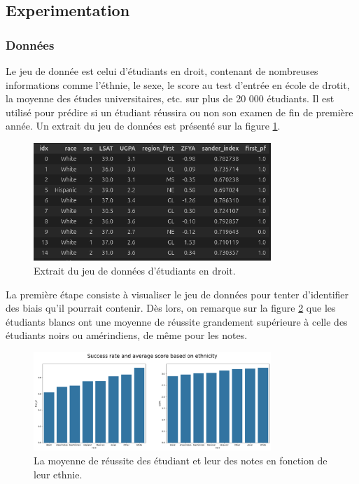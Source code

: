 \documentclass[12pt, letterpaper]{article}
\begin{document}
\subsection{Experimentation}

\subsubsection{Données}
Le jeu de donnée est celui d'étudiants en droit, contenant de nombreuses informations comme l'éthnie, le sexe, le score au test d'entrée en école de drotit, la moyenne des études universitaires, etc. sur plus de 20 000 étudiants.
Il est utilisé pour prédire si un étudiant réussira ou non son examen de fin de première année. Un extrait du jeu de données est présenté sur la figure \ref{fig:law_data}.

\begin{figure}[h!]
    \centering
    \includegraphics[width=0.8\textwidth]{law_data}
    \caption{Extrait du jeu de données d'étudiants en droit.}
    \label{fig:law_data}
\end{figure}

La première étape consiste à visualiser le jeu de données pour tenter d'identifier des biais qu'il pourrait contenir.
Dès lors, on remarque sur la figure \ref{fig:success_rate} que les étudiants blancs ont une moyenne de réussite grandement supérieure à celle des étudiants noirs ou amérindiens, de même pour les notes.

\begin{figure}[h!]
    \centering
    \includegraphics[width=0.8\textwidth]{success_rate}
    \caption{La moyenne de réussite des étudiant et leur des notes en fonction de leur ethnie.}
    \label{fig:success_rate}
\end{figure}
\end{document}
